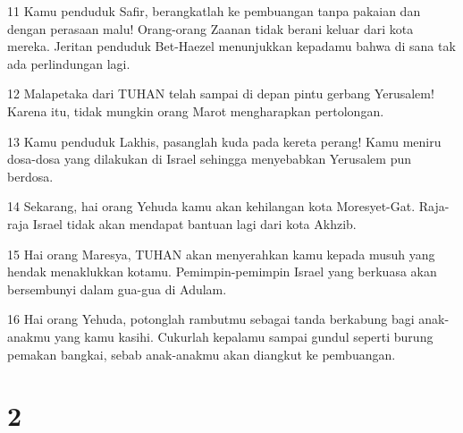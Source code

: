 \par 11 Kamu penduduk Safir, berangkatlah ke pembuangan tanpa pakaian dan dengan perasaan malu! Orang-orang Zaanan tidak berani keluar dari kota mereka. Jeritan penduduk Bet-Haezel menunjukkan kepadamu bahwa di sana tak ada perlindungan lagi.
\par 12 Malapetaka dari TUHAN telah sampai di depan pintu gerbang Yerusalem! Karena itu, tidak mungkin orang Marot mengharapkan pertolongan.
\par 13 Kamu penduduk Lakhis, pasanglah kuda pada kereta perang! Kamu meniru dosa-dosa yang dilakukan di Israel sehingga menyebabkan Yerusalem pun berdosa.
\par 14 Sekarang, hai orang Yehuda kamu akan kehilangan kota Moresyet-Gat. Raja-raja Israel tidak akan mendapat bantuan lagi dari kota Akhzib.
\par 15 Hai orang Maresya, TUHAN akan menyerahkan kamu kepada musuh yang hendak menaklukkan kotamu. Pemimpin-pemimpin Israel yang berkuasa akan bersembunyi dalam gua-gua di Adulam.
\par 16 Hai orang Yehuda, potonglah rambutmu sebagai tanda berkabung bagi anak-anakmu yang kamu kasihi. Cukurlah kepalamu sampai gundul seperti burung pemakan bangkai, sebab anak-anakmu akan diangkut ke pembuangan.

\chapter{2}

